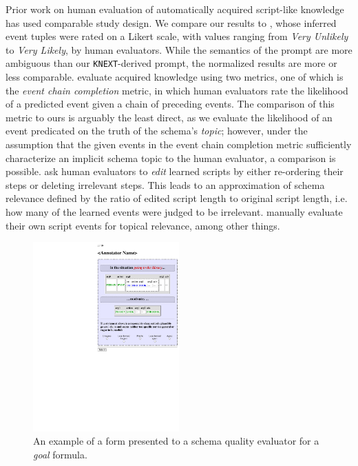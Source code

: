 Prior work on human evaluation of automatically acquired script-like knowledge has used comparable study design. We compare our results to \citet{pichotta2016learning}, whose inferred event tuples were rated on a Likert scale, with values ranging from \textit{Very Unlikely} to \textit{Very Likely}, by human evaluators. While the semantics of the prompt are more ambiguous than our \texttt{KNEXT}-derived prompt, the normalized results are more or less comparable. \citet{weber_causal_scripts} evaluate acquired knowledge using two metrics, one of which is the \textit{event chain completion} metric, in which human evaluators rate the likelihood of a predicted event given a chain of preceding events. The comparison of this metric to ours is arguably the least direct, as we evaluate the likelihood of an event predicated on the truth of the schema's \textit{topic}; however, under the assumption that the given events in the event chain completion metric sufficiently characterize an implicit schema topic to the human evaluator, a comparison is possible. \citet{goal-oriented-scripts} ask human evaluators to \textit{edit} learned scripts by either re-ordering their steps or deleting irrelevant steps. This leads to an approximation of schema relevance defined by the ratio of edited script length to original script length, i.e. how many of the learned events were judged to be irrelevant. \citet{starsem-scripts} manually evaluate their own script events for topical relevance, among other things.

\begin{figure}
    \centering
    \includegraphics[width=0.5\textwidth]{CH4_learning/evaleg4.pdf}
    \caption{An example of a form presented to a schema quality evaluator for a \textit{goal} formula.}
    \label{fig:goal_eval_eg}
\end{figure}

